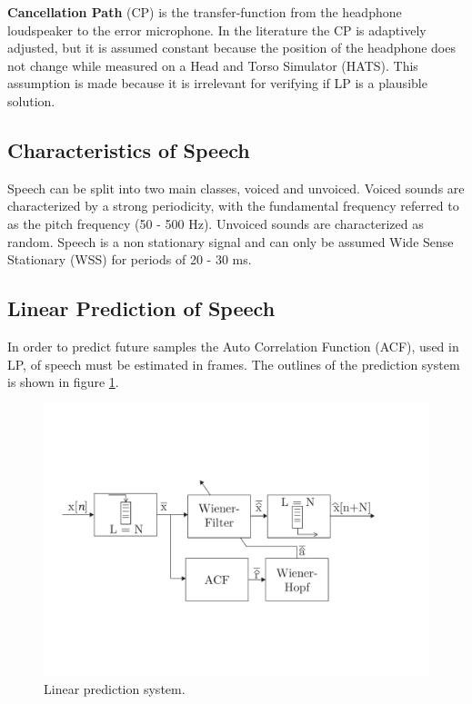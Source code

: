 \textbf{Cancellation Path} (CP) is the transfer-function from the headphone loudspeaker to the error microphone. In the literature \cite{Hansen} the CP is adaptively adjusted, but it is assumed constant because the position of the headphone does not change while measured on a Head and Torso Simulator (HATS). This assumption is made because it is irrelevant for verifying if LP is a plausible solution. 



\subsection{Characteristics of Speech}
Speech can be split into two main classes, voiced and unvoiced. Voiced sounds are characterized by a strong periodicity, with the fundamental frequency referred to as the pitch frequency (50 - 500 Hz). Unvoiced sounds are characterized as random. Speech is a non stationary signal and can only be assumed Wide Sense Stationary (WSS) for periods of 20 - 30 ms\cite{Speech}. 

\subsection{Linear Prediction of Speech}
In order to predict future samples the Auto Correlation Function (ACF), used in LP, of speech must be estimated in frames. The outlines of the prediction system is shown in figure \ref{fig:LinearPredictionOverview}.

\begin{figure}[H]
	\centering
	\includegraphics[width=\columnwidth]{figures/ArticleIllustrations/WienerHopf}
	\caption{Linear prediction system.}
	\label{fig:LinearPredictionOverview}
\end{figure}


